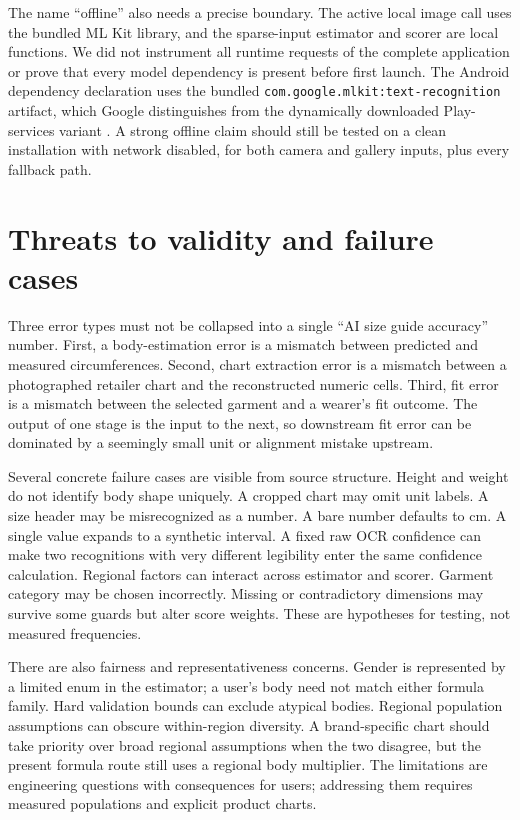 \documentclass[11pt,a4paper]{article}
\begin{document}
The name ``offline'' also needs a precise boundary. The active local image call uses the bundled ML Kit library, and the sparse-input estimator and scorer are local functions. We did not instrument all runtime requests of the complete application or prove that every model dependency is present before first launch. The Android dependency declaration uses the bundled \texttt{com.google.mlkit:text-recognition} artifact, which Google distinguishes from the dynamically downloaded Play-services variant \cite{mlkit}. A strong offline claim should still be tested on a clean installation with network disabled, for both camera and gallery inputs, plus every fallback path.

\section{Threats to validity and failure cases}
Three error types must not be collapsed into a single ``AI size guide accuracy'' number. First, a body-estimation error is a mismatch between predicted and measured circumferences. Second, chart extraction error is a mismatch between a photographed retailer chart and the reconstructed numeric cells. Third, fit error is a mismatch between the selected garment and a wearer's fit outcome. The output of one stage is the input to the next, so downstream fit error can be dominated by a seemingly small unit or alignment mistake upstream.

Several concrete failure cases are visible from source structure. Height and weight do not identify body shape uniquely. A cropped chart may omit unit labels. A size header may be misrecognized as a number. A bare number defaults to cm. A single value expands to a synthetic interval. A fixed raw OCR confidence can make two recognitions with very different legibility enter the same confidence calculation. Regional factors can interact across estimator and scorer. Garment category may be chosen incorrectly. Missing or contradictory dimensions may survive some guards but alter score weights. These are hypotheses for testing, not measured frequencies.

There are also fairness and representativeness concerns. Gender is represented by a limited enum in the estimator; a user's body need not match either formula family. Hard validation bounds can exclude atypical bodies. Regional population assumptions can obscure within-region diversity. A brand-specific chart should take priority over broad regional assumptions when the two disagree, but the present formula route still uses a regional body multiplier. The limitations are engineering questions with consequences for users; addressing them requires measured populations and explicit product charts.
\end{document}
